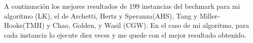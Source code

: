 \bigskip

A continuación los mejores resultados de 199 instancias del bechmark para mi algoritmo (LK), el de Archetti, Hertz y Speranza(AHS), Tang y Miller-Hooks(TMH) y Chao, Golden, y Wasil (CGW). En el caso de mi algoritmo, para cada instancia lo ejecute diez veces y me quede con el mejor resultado obtenido.